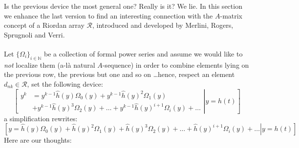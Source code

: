 Is the previous device the most general one? Really is it? 
We lie. In this section we enhance the last version to 
find an interesting connection with 
the $A$-matrix concept of a Riordan array $\mathcal{R}$, 
introduced and developed by Merlini, Rogers, Sprugnoli and Verri.
\\\\
Let $\lbrace\Omega_{i}\rbrace_{i\in\mathbb{N}}$ be a collection of formal
power series and assume we would like to \emph{not} localize them (a-l\`a natural 
$A$-sequence) in order to combine elements lying on the previous row, the previous
but one and so on \ldots hence, respect an element $d_{nk}\in\mathcal{R}$,
set the following device:
\begin{displaymath}
    \left.\left[
            \begin{split}
                y^{k} &= y^{k-1}\hat{h}(y) \Omega_{0}(y) + 
                y^{k-1}\hat{h}(y)^{2} \Omega_{1}(y) \\
                &+ y^{k-1}\hat{h}(y)^{3} \Omega_{2}(y) +
                \ldots +
                y^{k-1}\hat{h}(y)^{i+1} \Omega_{i}(y) + \ldots
            \end{split}
        \right| y = h(t) \right]
\end{displaymath}
a simplification rewrites:
\begin{displaymath}
    \left.\left[
        y = \hat{h}(y) \Omega_{0}(y) + 
        \hat{h}(y)^{2} \Omega_{1}(y) + \hat{h}(y)^{3} \Omega_{2}(y) +
        \ldots +
        \hat{h}(y)^{i+1} \Omega_{i}(y) + \ldots
        \right| y = h(t) \right]
\end{displaymath}
Here are our thoughts:

